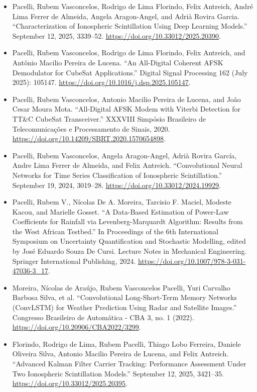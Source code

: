 \documentclass{article}
\begin{document}

\begin{itemize}
    \item Pacelli, Rubem Vasconcelos, Rodrigo de Lima Florindo, Felix Antreich, André Lima Ferrer de Almeida, Angela Aragon-Angel, and Adrià Rovira Garcia. “Characterization of Ionospheric Scintillation Using Deep Learning Models.” September 12, 2025, 3339–52. \url{https://doi.org/10.33012/2025.20390}.
    \item Pacelli, Rubem Vasconcelos, Rodrigo de Lima Florindo, Felix Antreich, and Antônio Macilio Pereira de Lucena. “An All-Digital Coherent AFSK Demodulator for CubeSat Applications.” Digital Signal Processing 162 (July 2025): 105147. \url{https://doi.org/10.1016/j.dsp.2025.105147}.
    \item Pacelli, Rubem Vasconcelos, Antonio Macilio Pereira de Lucena, and João Cesar Moura Mota. “All-Digital AFSK Modem with Viterbi Detection for TT\&C CubeSat Transceiver.” XXXVIII Simpósio Brasileiro de Telecomunicações e Processamento de Sinais, 2020. \url{https://doi.org/10.14209/SBRT.2020.1570654898}.
    \item Pacelli, Rubem Vasconcelos, Angela Aragon-Angel, Adrià Rovira García, Andre Lima Ferrer de Almeida, and Felix Antreich. “Convolutional Neural Networks for Time Series Classification of Ionospheric Scintillation.” September 19, 2024, 3019–28. \url{https://doi.org/10.33012/2024.19929}.
    \item Pacelli, Rubem V., Nícolas De A. Moreira, Tarcisio F. Maciel, Modeste Kacou, and Marielle Gosset. “A Data-Based Estimation of Power-Law Coefficients for Rainfall via Levenberg-Marquardt Algorithm: Results from the West African Testbed.” In Proceedings of the 6th International Symposium on Uncertainty Quantification and Stochastic Modelling, edited by José Eduardo Souza De Cursi. Lecture Notes in Mechanical Engineering. Springer International Publishing, 2024. \url{https://doi.org/10.1007/978-3-031-47036-3\_17}.
    \item Moreira, Nícolas de Araújo, Rubem Vasconcelos Pacelli, Yuri Carvalho Barbosa Silva, et al. “Convolutional Long-Short-Term Memory Networks (ConvLSTM) for Weather Prediction Using Radar and Satellite Images.” Congresso Brasileiro de Automática - CBA 3, no. 1 (2022). \url{https://doi.org/10.20906/CBA2022/3299}.
    \item Florindo, Rodrigo de Lima, Rubem Pacelli, Thiago Lobo Ferreira, Daniele Oliveira Silva, Antonio Macilio Pereira de Lucena, and Felix Antreich. “Advanced Kalman Filter Carrier Tracking: Performance Assessment Under Two Ionospheric Scintillation Models.” September 12, 2025, 3421–35. \url{https://doi.org/10.33012/2025.20395}.
\end{itemize}
\end{document}
